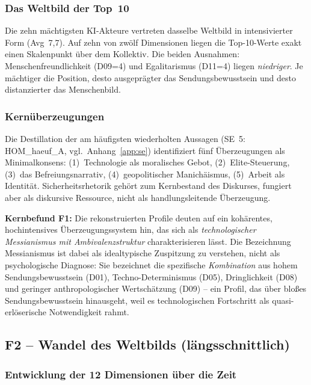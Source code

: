 \documentclass[12pt,a4paper]{article}
\begin{document}
\subsubsection{Das Weltbild der Top~10}

Die zehn m\"achtigsten KI-Akteure vertreten dasselbe Weltbild in intensivierter Form (Avg~7,7). Auf zehn von zw\"olf Dimensionen liegen die Top-10-Werte exakt einen Skalenpunkt \"uber dem Kollektiv. Die beiden Ausnahmen: Menschenfreundlichkeit (D09=4) und Egalitarismus (D11=4) liegen \emph{niedriger}. Je m\"achtiger die Position, desto ausgepr\"agter das Sendungsbewusstsein und desto distanzierter das Menschenbild.


\subsubsection{Kern\"uberzeugungen}

Die Destillation der am h\"aufigsten wiederholten Aussagen (SE~5: HOM\_haeuf\_A, vgl.\ Anhang~\ref{app:se}) identifiziert f\"unf \"Uberzeugungen als Minimalkonsens: (1)~Technologie als moralisches Gebot, (2)~Elite-Steuerung, (3)~das Befreiungsnarrativ, (4)~geopolitischer Manich\"aismus, (5)~Arbeit als Identit\"at. Sicherheitsrhetorik geh\"ort zum Kernbestand des Diskurses, fungiert aber als diskursive Ressource, nicht als handlungsleitende \"Uberzeugung.

\medskip
\noindent\textbf{Kernbefund F1:} Die rekonstruierten Profile deuten auf ein koh\"arentes, hochintensives \"Uberzeugungssystem hin, das sich als \emph{technologischer Messianismus mit Ambivalenzstruktur} charakterisieren l\"asst. Die Bezeichnung \glqq Messianismus\grqq{} ist dabei als idealtypische Zuspitzung zu verstehen, nicht als psychologische Diagnose: Sie bezeichnet die spezifische \emph{Kombination} aus hohem Sendungsbewusstsein (D01), Techno-Determinismus (D05), Dringlichkeit (D08) und geringer anthropologischer Wertsch\"atzung (D09) -- ein Profil, das \"uber blo\ss{}es Sendungsbewusstsein hinausgeht, weil es technologischen Fortschritt als quasi-erl\"oserische Notwendigkeit rahmt.


\subsection{F2 -- Wandel des Weltbilds (l\"angsschnittlich)}
\label{sec:ergebnisse:f2}

\subsubsection{Entwicklung der 12 Dimensionen \"uber die Zeit}
\end{document}
